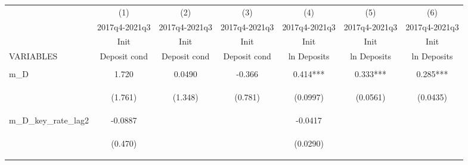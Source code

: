 \documentclass[]{article}
\begin{document}
\begin{center}
\begin{tabular}{lcccccc} \hline
 & (1) & (2) & (3) & (4) & (5) & (6) \\
 & 2017q4-2021q3 & 2017q4-2021q3 & 2017q4-2021q3 & 2017q4-2021q3 & 2017q4-2021q3 & 2017q4-2021q3 \\
 & Init & Init & Init & Init & Init & Init \\
VARIABLES & Deposit cond & Deposit cond & Deposit cond & ln Deposits & ln Deposits & ln Deposits \\ \hline
\vspace{4pt} & \begin{footnotesize}\end{footnotesize} & \begin{footnotesize}\end{footnotesize} & \begin{footnotesize}\end{footnotesize} & \begin{footnotesize}\end{footnotesize} & \begin{footnotesize}\end{footnotesize} & \begin{footnotesize}\end{footnotesize} \\
m\_D & 1.720 & 0.0490 & -0.366 & 0.414*** & 0.333*** & 0.285*** \\
\vspace{4pt} & \begin{footnotesize}(1.761)\end{footnotesize} & \begin{footnotesize}(1.348)\end{footnotesize} & \begin{footnotesize}(0.781)\end{footnotesize} & \begin{footnotesize}(0.0997)\end{footnotesize} & \begin{footnotesize}(0.0561)\end{footnotesize} & \begin{footnotesize}(0.0435)\end{footnotesize} \\
m\_D\_key\_rate\_lag2 & -0.0887 &  &  & -0.0417 &  &  \\
\vspace{4pt} & \begin{footnotesize}(0.470)\end{footnotesize} & \begin{footnotesize}\end{footnotesize} & \begin{footnotesize}\end{footnotesize} & \begin{footnotesize}(0.0290)\end{footnotesize} & \begin{footnotesize}\end{footnotesize} & \begin{footnotesize}\end{footnotesize} \\

\end{tabular}
\end{center}
\end{document}
